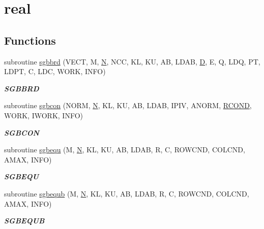 \hypertarget{group__realGBcomputational}{}\section{real}
\label{group__realGBcomputational}
\subsection*{Functions}
\begin{DoxyCompactItemize}
\item 
subroutine \hyperlink{group__realGBcomputational_ga1929cafd58d8fe59c200282e4497da0a}{sgbbrd} (V\+E\+C\+T, M, \hyperlink{polmisc_8c_a0240ac851181b84ac374872dc5434ee4}{N}, N\+C\+C, K\+L, K\+U, A\+B, L\+D\+A\+B, \hyperlink{odrpack_8h_a7dae6ea403d00f3687f24a874e67d139}{D}, E, Q, L\+D\+Q, P\+T, L\+D\+P\+T, C, L\+D\+C, W\+O\+R\+K, I\+N\+F\+O)
\begin{DoxyCompactList}\small\item\em {\bfseries S\+G\+B\+B\+R\+D} \end{DoxyCompactList}\item 
subroutine \hyperlink{group__realGBcomputational_gab69fe5a37c3f7361c009bce69f8baf3d}{sgbcon} (N\+O\+R\+M, \hyperlink{polmisc_8c_a0240ac851181b84ac374872dc5434ee4}{N}, K\+L, K\+U, A\+B, L\+D\+A\+B, I\+P\+I\+V, A\+N\+O\+R\+M, \hyperlink{superlu__enum__consts_8h_af00a42ecad444bbda75cde1b64bd7e72a9b5c151728d8512307565994c89919d5}{R\+C\+O\+N\+D}, W\+O\+R\+K, I\+W\+O\+R\+K, I\+N\+F\+O)
\begin{DoxyCompactList}\small\item\em {\bfseries S\+G\+B\+C\+O\+N} \end{DoxyCompactList}\item 
subroutine \hyperlink{group__realGBcomputational_gad6b951dfd2b71d1eb527d5f41da07ed2}{sgbequ} (M, \hyperlink{polmisc_8c_a0240ac851181b84ac374872dc5434ee4}{N}, K\+L, K\+U, A\+B, L\+D\+A\+B, R, C, R\+O\+W\+C\+N\+D, C\+O\+L\+C\+N\+D, A\+M\+A\+X, I\+N\+F\+O)
\begin{DoxyCompactList}\small\item\em {\bfseries S\+G\+B\+E\+Q\+U} \end{DoxyCompactList}\item 
subroutine \hyperlink{group__realGBcomputational_ga8c2e30003a6a88fdf225cdd5fddc2a28}{sgbequb} (M, \hyperlink{polmisc_8c_a0240ac851181b84ac374872dc5434ee4}{N}, K\+L, K\+U, A\+B, L\+D\+A\+B, R, C, R\+O\+W\+C\+N\+D, C\+O\+L\+C\+N\+D, A\+M\+A\+X, I\+N\+F\+O)
\begin{DoxyCompactList}\small\item\em {\bfseries S\+G\+B\+E\+Q\+U\+B} \end{DoxyCompactList}\item 

\end{DoxyCompactItemize}
